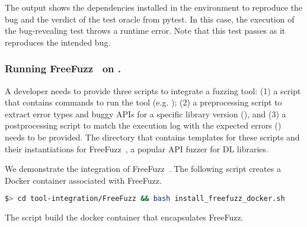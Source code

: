 \documentclass[sigconf,screen]{acmart}
\begin{document}
The output shows the dependencies installed in the environment to
reproduce the bug and the verdict of the test oracle from pytest. In
this case, the execution of the bug-revealing test throws a runtime
error. Note that this test passes as it reproduces the intended bug.



\subsubsection{Running FreeFuzz~\cite{wei2022free} on \tname.}\label{sec:running-free-fuzz}

A developer needs to provide three scripts to integrate a fuzzing
tool: (1) a script that contains commands to run the tool (e.g. ); (2) a
preprocessing script to extract error types and buggy APIs for a
specific library version (), and (3) a postprocessing script to match the
execution log with the expected errors () needs to be provided.
The
directory  that contains templates for these
scripts and their instantiations for FreeFuzz~\cite{wei2022free}, a
popular API fuzzer for DL libraries.

We demonstrate the integration of FreeFuzz~\cite{wei2022free}. The
following script creates a Docker container associated with FreeFuzz.

\begin{lstlisting}[language=bash,basicstyle=\small,keywords={}]
$> cd tool-integration/FreeFuzz && bash install_freefuzz_docker.sh
\end{lstlisting}

\noindent
The script  build the docker
container that encapsulates FreeFuzz.

\end{document}
